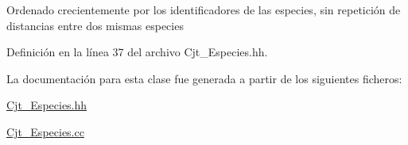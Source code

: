 Ordenado crecientemente por los identificadores de las especies, sin repetición de distancias entre dos mismas especies 

Definición en la línea 37 del archivo Cjt\+\_\+\+Especies.\+hh.



La documentación para esta clase fue generada a partir de los siguientes ficheros\+:\begin{DoxyCompactItemize}
\item 
\hyperlink{_cjt___especies_8hh}{Cjt\+\_\+\+Especies.\+hh}\item 
\hyperlink{_cjt___especies_8cc}{Cjt\+\_\+\+Especies.\+cc}\end{DoxyCompactItemize}
